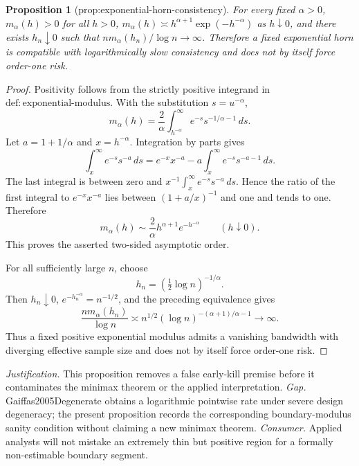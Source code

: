 \documentclass{article}
\newtheorem{proposition}{Proposition}
\begin{document}
\begin{proposition}[prop:exponential-horn-consistency]\label{prop:exponential-horn-consistency}
For every fixed \(\alpha>0\), \(m_{\alpha}(h)>0\) for all \(h>0\), \(m_{\alpha}(h)\asymp h^{\alpha+1}\exp(-h^{-\alpha})\) as \(h\downarrow0\), and there exists \(h_n\downarrow0\) such that \(n m_{\alpha}(h_n)/\log n\to\infty\). Therefore a fixed exponential horn is compatible with logarithmically slow consistency and does not by itself force order-one risk.
\end{proposition}
\begin{proof}
Positivity follows from the strictly positive integrand in \(\mathrm{def:exponential\text{-}modulus}\). With the substitution \(s=u^{-\alpha}\),
\[
 m_\alpha(h)=\frac2\alpha\int_{h^{-\alpha}}^\infty e^{-s}s^{-1/\alpha-1}\,ds.
\]
Let \(a=1+1/\alpha\) and \(x=h^{-\alpha}\). Integration by parts gives
\[
 \int_x^\infty e^{-s}s^{-a}\,ds
 =e^{-x}x^{-a}-a\int_x^\infty e^{-s}s^{-a-1}\,ds.
\]
The last integral is between zero and \(x^{-1}\int_x^\infty e^{-s}s^{-a}\,ds\). Hence the ratio of the first integral to \(e^{-x}x^{-a}\) lies between \((1+a/x)^{-1}\) and one and tends to one. Therefore
\[
 m_\alpha(h)\sim\frac2\alpha h^{\alpha+1}e^{-h^{-\alpha}}
 \qquad(h\downarrow0).
\]
This proves the asserted two-sided asymptotic order.

For all sufficiently large \(n\), choose
\[
 h_n=\left(\tfrac12\log n\right)^{-1/\alpha}.
\]
Then \(h_n\downarrow0\), \(e^{-h_n^{-\alpha}}=n^{-1/2}\), and the preceding equivalence gives
\[
 \frac{n m_\alpha(h_n)}{\log n}
 \asymp n^{1/2}(\log n)^{-(\alpha+1)/\alpha-1}\longrightarrow\infty.
\]
Thus a fixed positive exponential modulus admits a vanishing bandwidth with diverging effective sample size and does not by itself force order-one risk.
\end{proof}
\par\smallskip\noindent \textit{Justification.} This proposition removes a false early-kill premise before it contaminates the minimax theorem or the applied interpretation. \textit{Gap.} Gaiffas2005Degenerate obtains a logarithmic pointwise rate under severe design degeneracy; the present proposition records the corresponding boundary-modulus sanity condition without claiming a new minimax theorem. \textit{Consumer.} Applied analysts will not mistake an extremely thin but positive region for a formally non-estimable boundary segment.
\end{document}
